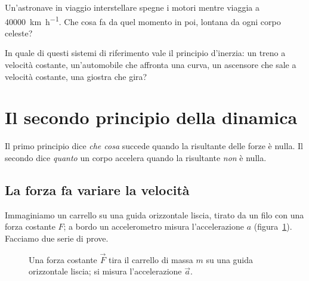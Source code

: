 \begin{esercizio}
Un'astronave in viaggio interstellare spegne i motori mentre viaggia a \SI{40000}{\kilo\metre\per\hour}. Che cosa fa da quel momento in poi, lontana da ogni corpo celeste?\\
\end{esercizio}

\begin{esercizio}
In quale di questi sistemi di riferimento vale il principio d'inerzia: un treno a velocità costante, un'automobile che affronta una curva, un ascensore che sale a velocità costante, una giostra che gira?\\
\end{esercizio}

\section{Il secondo principio della dinamica}

Il primo principio dice \emph{che cosa} succede quando la risultante delle forze è nulla. Il secondo dice \emph{quanto} un corpo accelera quando la risultante \emph{non} è nulla.

\subsection{La forza fa variare la velocità}
Immaginiamo un carrello su una guida orizzontale liscia, tirato da un filo con una forza costante $F$; a bordo un accelerometro misura l'accelerazione $a$ (figura~\ref{fig:carrello-2principio}). Facciamo due serie di prove.

\begin{figure}[!htbp]
    \centering
    \caption{Una forza costante $\vec F$ tira il carrello di massa $m$ su una guida orizzontale liscia; si misura l'accelerazione $\vec a$.}
    \label{fig:carrello-2principio}
\end{figure}

